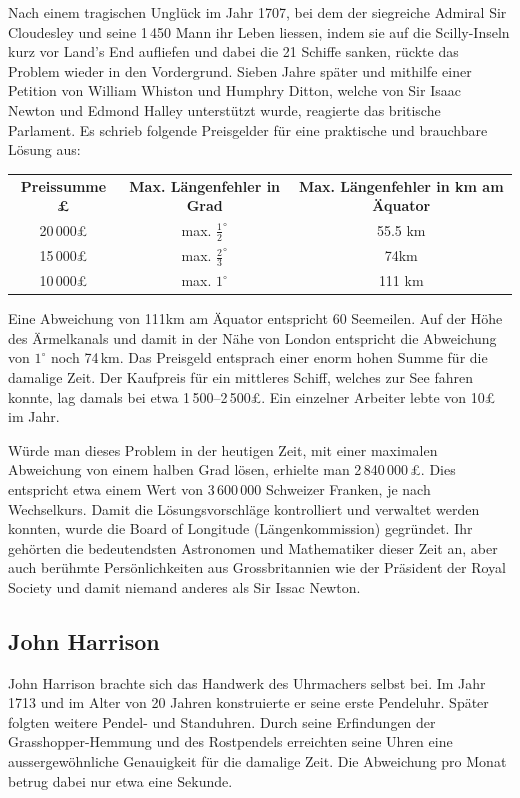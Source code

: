 \begin{refsection}
Nach einem tragischen Unglück im Jahr 1707, bei dem der siegreiche
Admiral Sir Cloudesley und seine 1\,450 Mann ihr Leben liessen, indem
sie auf die Scilly-Inseln kurz vor Land's End aufliefen und dabei
die 21 Schiffe sanken, rückte das Problem wieder in den Vordergrund.
%
%
Sieben Jahre später und mithilfe einer Petition von William Whiston
und Humphry Ditton, welche von Sir Isaac Newton und Edmond Halley
unterstützt wurde, reagierte das britische Parlament.
%
%
Es schrieb folgende Preisgelder für eine praktische und brauchbare
Lösung aus:
\begin{center}
\renewcommand{\arraystretch}{1.5}
\begin{tabular}{ccc}
\textbf{Preissumme £} & \textbf{Max. Längenfehler in Grad} & \textbf{Max. Längenfehler in km am Äquator}  \\
20\,000£ & max. $\frac{1}{2}^{\circ}$ & 55.5 km \\
15\,000£ & max. $\frac{2}{3}^{\circ}$ & 74km \\
10\,000£ & max. $1 ^{\circ}$ & 111 km 
\end{tabular}
\end{center}

Eine Abweichung von 111km am Äquator entspricht 60 Seemeilen.
Auf der Höhe des Ärmelkanals und damit in der Nähe von London
entspricht die Abweichung von $1 ^{\circ}$ noch 74\,km.
Das Preisgeld entsprach einer enorm hohen Summe für die damalige
Zeit. Der Kaufpreis für ein mittleres Schiff, welches zur See fahren
konnte, lag damals bei etwa 1\,500--2\,500£. Ein einzelner Arbeiter
lebte von 10£ im Jahr.

Würde man dieses Problem in der heutigen Zeit, mit einer maximalen
Abweichung von einem halben Grad lösen, erhielte man 2\,840\,000\,£.
Dies entspricht etwa einem Wert von 3\,600\,000 Schweizer Franken,
je nach Wechselkurs.
Damit die Lösungsvorschläge kontrolliert und verwaltet werden
konnten, wurde die Board of Longitude (Längenkommission) gegründet.
Ihr gehörten die bedeutendsten Astronomen und Mathematiker dieser
Zeit an, aber auch berühmte Persönlichkeiten aus Grossbritannien
wie der Präsident der Royal Society und damit niemand anderes als
Sir Issac Newton.

\subsection{John Harrison}
%
John Harrison brachte sich das Handwerk des Uhrmachers selbst bei.
Im Jahr 1713 und im Alter von 20 Jahren konstruierte er seine erste
Pendeluhr. Später folgten weitere Pendel- und Standuhren. Durch
seine Erfindungen der Grasshopper-Hemmung und des Rostpendels
erreichten seine Uhren eine aussergewöhnliche Genauigkeit für die
damalige Zeit. Die Abweichung pro Monat betrug dabei nur etwa eine
Sekunde.


\end{refsection}
